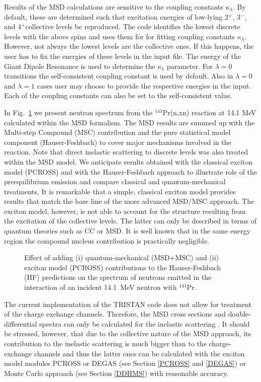 \documentclass[twocolumn,amsmath,amssymb,10pt,groupedaddress,a4paper]{revtex4}
\begin{document}
Results of the MSD calculations are sensitive to the coupling
constants $\kappa_{\lambda}$. By default, these are determined such
that excitation energies of low-lying 2$^{+}$, 3$^{-}$, and 4$^{+}$collective
levels be reproduced. The code identifies the lowest discrete levels
with the above spins and uses them for for fitting coupling constants
$\kappa_{\lambda}$. However, not always the lowest levels are the
collective ones. If this happens, the user has to fix the energies
of these levels in the input file. The energy of the Giant Dipole
Resonance is used to determine the $\kappa_{1}$ parameter. For $\lambda=0$
transitions the self-consistent coupling constant is used by default.
Also in $\lambda=0$ and $\lambda=1$ cases user may choose to provide
the respective energies in the input. Each of the coupling constants
can also be set to the self-consistent value.

In Fig.~\ref{PrMSD} we present neutron spectrum from the $^{141}$Pr(n,xn) reaction at 14.1 MeV
calculated within the MSD formalism. The MSD results are summed up with the Multi-step Compound (MSC) contribution and the pure statistical model component (Hauser-Feshbach) to cover major mechanisms involved in the reaction. Note that direct inelastic scattering to discrete levels was also treated within the MSD model. We anticipate results obtained with the classical exciton model (PCROSS) and with the Hauser-Feshbach approach to illustrate role of the preequilibrium emission and compare classical and quantum-mechanical treatments. It is remarkable that a simple, classical exciton model provides results that match the base line of the more advanced MSD/MSC approach. The exciton model, however, is not able to account for the structure resulting from the excitation of the collective levels. The latter can only be described in terms of quantum theories such as CC or MSD. It is well known that in the same energy region the compound nucleus contribution is practically negligible.

\begin{figure}[htbp]
\caption{Effect of adding (i) quantum-mechanical (MSD+MSC) and (ii) exciton model (PCROSS) contributions to the Hauser-Feshbach (HF) predictions on the spectrum of neutrons emitted in the interaction of an incident
14.1~MeV neutron with $^{141}$Pr.}
\label{PrMSD}
\end{figure}


The current implementation of the TRISTAN
code does not allow for treatment of the charge exchange channels.
Therefore, the MSD cross sections and double-differential
spectra can only be calculated for the inelastic scattering . It should
be stressed, however, that due to the collective nature of the MSD
approach, its contribution to the inelastic scattering is much bigger
than to the charge-exchange channels and thus the latter ones can
be calculated with the exciton model modules PCROSS or DEGAS (see Section
\ref{PCROSS} and \ref{DEGAS}) or Monte Carlo approach (see Section \ref{DDHMS}) with
reasonable accuracy.
\end{document}
